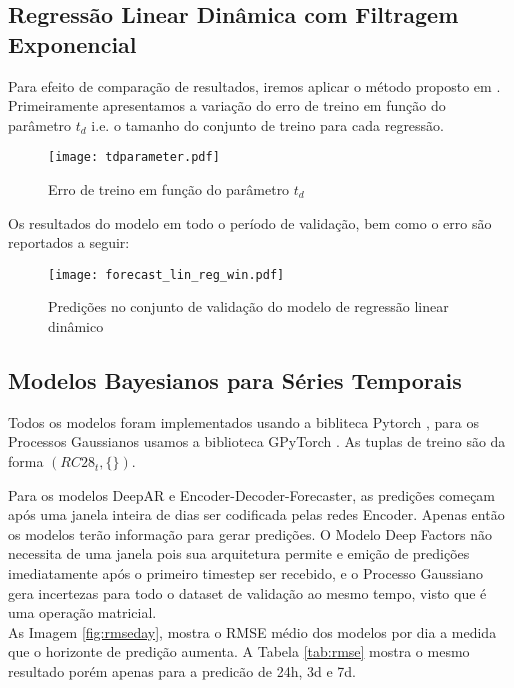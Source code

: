 \subsection{Regressão Linear Dinâmica com Filtragem Exponencial}

Para efeito de comparação de resultados, iremos aplicar o método proposto em
\citep{grecialin}. Primeiramente apresentamos a variação do erro de treino em
função do parâmetro $t_d$ i.e. o tamanho do conjunto de treino para cada
regressão.

\begin{figure}[H]
  \centering
  \texttt{[image: tdparameter.pdf]}
  \caption{Erro de treino em função do parâmetro $t_d$}
  \label{fig:tdparam}
\end{figure}

Os resultados do modelo em todo o período de validação, bem como o erro são
reportados a seguir:

\begin{figure}[H]
  \centering
  \texttt{[image: forecast\_lin\_reg\_win.pdf]}
  \caption{Predições no conjunto de validação do modelo de regressão linear dinâmico}
  \label{fig:tdparam}
\end{figure}

\subsection{Modelos Bayesianos para Séries Temporais}


Todos os modelos foram implementados usando a bibliteca Pytorch \cite{pytorch}, para os Processos Gaussianos usamos a biblioteca GPyTorch \cite{gpytorch}. As tuplas de treino são da forma $(RC28_{t},\{\})$. 

Para os modelos DeepAR e Encoder-Decoder-Forecaster, as predições começam após uma janela inteira de dias ser codificada pelas redes Encoder. Apenas então os modelos terão informação para gerar predições. O Modelo Deep Factors não necessita de uma janela pois sua arquitetura permite e emição de predições imediatamente após o primeiro timestep ser recebido, e o Processo Gaussiano gera incertezas para todo o dataset de validação ao mesmo tempo, visto que é uma operação matricial. \\

As Imagem \ref{fig:rmseday}, mostra o RMSE médio dos modelos por dia a medida que o horizonte de predição aumenta. A Tabela \ref{tab:rmse} mostra o mesmo resultado porém apenas para a predicão de 24h, 3d e 7d. \\



